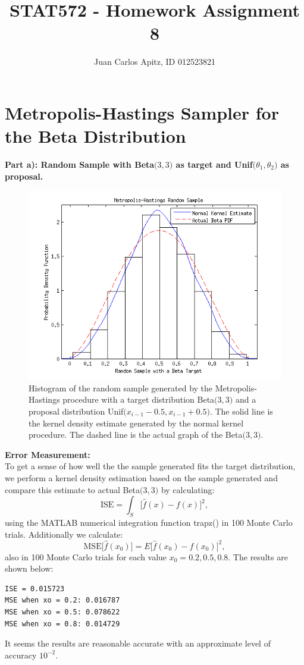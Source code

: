 \documentclass[12pt,a4paper]{article}
\author{Juan Carlos Apitz, ID 012523821}
\title{STAT572 - Homework Assignment 8}
\begin{document}
\maketitle

\section*{Metropolis-Hastings Sampler for the Beta Distribution}

\textbf{Part a): Random Sample with Beta$\bigr(3,3)$ as target and Unif$\bigr(\theta_1,\theta_2\bigr)$ as proposal.}

\begin{figure}[ht!] 
\begin{center}
\includegraphics[scale=1]{inclass_graph1.png}
\caption{Histogram of the random sample generated by the Metropolis-Hastings procedure with a target distribution Beta$\bigr(3,3\bigr)$ and a proposal distribution Unif$\bigr(x_{i-1}-0.5, x_{i-1}+0.5\bigr)$. The solid line is the kernel density estimate generated by the normal kernel procedure. The dashed line is the actual graph of the Beta$\bigr(3,3\bigr)$.}
\label{inclass fig1}
\end{center}
\end{figure}
\FloatBarrier
\textbf{Error Measurement:}\\
To get a sense of how well the the sample generated fits the target distribution, we perform a kernel density estimation based on the sample generated and compare this estimate to actual Beta$\bigr(3,3\bigr)$ by calculating: \[\text{ISE}=\int_S\Bigr[\hat{f}(x)-f(x)\Bigr]^2,\]
using the MATLAB numerical integration function trapz() in 100 Monte Carlo trials. Additionally we calculate:
\[\text{MSE}\Bigr[\hat{f}(x_0)\Bigr]=E\Bigr[\hat{f}(x_0)-f(x_0)\Bigr]^2,\]
also in 100 Monte Carlo trials for each value $x_0=0.2,0.5,0.8$. The results are shown below:
\begin{verbatim}
ISE = 0.015723
MSE when xo = 0.2: 0.016787
MSE when xo = 0.5: 0.078622
MSE when xo = 0.8: 0.014729 
\end{verbatim}
It seems the results are reasonable accurate with an approximate level of accuracy $10^{-2}$.\\
\end{document}
